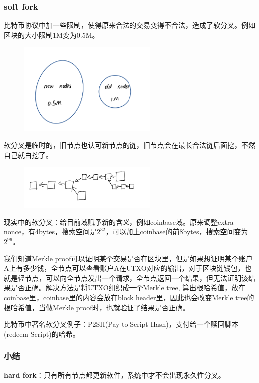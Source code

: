 \documentclass[10pt]{ctexart}
\begin{document}
\subsubsection{soft fork}
比特币协议中加一些限制，使得原来合法的交易变得不合法，造成了软分叉。例如区块的大小限制1M变为0.5M。
\begin{figure}[H]
    \centering
    \includegraphics[width=0.6\textwidth]{courses/区块链技术与应用/lecture10/img3.png} 
\end{figure}
软分叉是临时的，旧节点也认可新节点的链，旧节点会在最长合法链后面挖，不然自己就白挖了。
\begin{figure}[H]
    \centering
    \includegraphics[width=0.6\textwidth]{courses/区块链技术与应用/lecture10/img4.png} 
\end{figure}
现实中的软分叉：给目前域赋予新的含义，例如coinbase域。原来调整extra nonce，有4bytes，搜索空间是$2^{32}$，可以加上coinbase的前8bytes，搜索空间变为$2^{96}$。

我们知道Merkle proof可以证明某个交易是否在区块里，但是如果想证明某个账户A上有多少钱，全节点可以查看账户A在UTXO对应的输出，对于区块链钱包，也就是轻节点，可以向全节点发出一个请求，全节点返回一个结果，但无法证明该结果是否正确。解决方法是将UTXO组织成一个Merkle tree, 算出根哈希值，放在coinbase里，coinbase里的内容会放在block header里，因此也会改变Merkle tree的根哈希值，当做Merkle proof时，也就验证了结果是否正确。

比特币中著名软分叉例子：P2SH(Pay to Script Hash)，支付给一个赎回脚本(redeem Script)的哈希。
\subsubsection{小结}
\textbf{hard fork}：只有所有节点都更新软件，系统中才不会出现永久性分叉。
\end{document}
